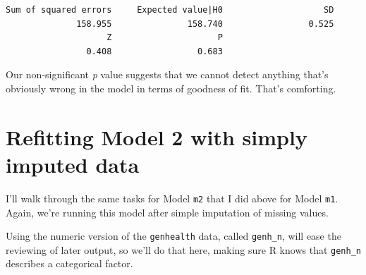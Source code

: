 \documentclass[]{book}
\newenvironment{Shaded}{\begin{snugshade}}{\end{snugshade}}
\newcommand{\KeywordTok}[1]{\textcolor[rgb]{0.13,0.29,0.53}{\textbf{#1}}}
\newcommand{\DataTypeTok}[1]{\textcolor[rgb]{0.13,0.29,0.53}{#1}}
\newcommand{\DecValTok}[1]{\textcolor[rgb]{0.00,0.00,0.81}{#1}}
\newcommand{\StringTok}[1]{\textcolor[rgb]{0.31,0.60,0.02}{#1}}
\newcommand{\OtherTok}[1]{\textcolor[rgb]{0.56,0.35,0.01}{#1}}
\newcommand{\OperatorTok}[1]{\textcolor[rgb]{0.81,0.36,0.00}{\textbf{#1}}}
\newcommand{\NormalTok}[1]{#1}
\theoremstyle{definition}
\theoremstyle{definition}
\theoremstyle{definition}
\theoremstyle{remark}
\begin{document}
\begin{verbatim}
Sum of squared errors     Expected value|H0                    SD 
              158.955               158.740                 0.525 
                    Z                     P 
                0.408                 0.683 
\end{verbatim}

Our non-significant \emph{p} value suggests that we cannot detect
anything that's obviously wrong in the model in terms of goodness of
fit. That's comforting.

\section{Refitting Model 2 with simply imputed
data}\label{refitting-model-2-with-simply-imputed-data}

I'll walk through the same tasks for Model \texttt{m2} that I did above
for Model \texttt{m1}. Again, we're running this model after simple
imputation of missing values.

Using the numeric version of the \texttt{genhealth} data, called
\texttt{genh\_n}, will ease the reviewing of later output, so we'll do
that here, making sure R knows that \texttt{genh\_n} describes a
categorical factor.

\begin{Shaded}
\end{Shaded}
\end{document}
